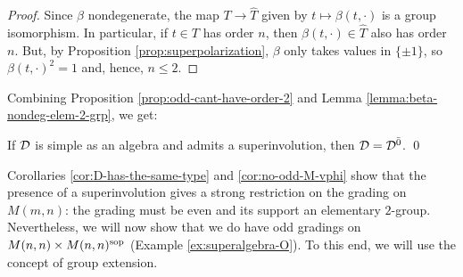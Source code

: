 \begin{proof}
    Since $\beta$ nondegenerate, the map $T \to \widehat T$ given by $t \mapsto \beta(t, \cdot)$ is a group isomorphism.
    In particular, if $t\in T$ has order $n$, then $\beta(t, \cdot)\in \widehat T$ also has order $n$.
    But, by Proposition \ref{prop:superpolarization}, $\beta$ only takes values in $\{ \pm 1\}$, so  $\beta(t, \cdot )^2 =1$ and, hence, $ n \leq 2$.
\end{proof}

Combining Proposition \ref{prop:odd-cant-have-order-2} and Lemma \ref{lemma:beta-nondeg-elem-2-grp}, we get:

\begin{cor}\label{cor:no-odd-M-vphi}
    If $\mathcal{D}$ is simple as an algebra and admits a superinvolution, then $\mathcal{D} = \mathcal{D}^{\bar0}$. \qed
\end{cor}


Corollaries \ref{cor:D-has-the-same-type} and \ref{cor:no-odd-M-vphi} show that the presence of a superinvolution gives a strong restriction on the grading on $M(m,n)$: the grading must be even and its support an elementary $2$-group. 
Nevertheless, we will now show that we do have odd gradings on $M(n,n)\times M(n,n)^{\mathrm{sop}}$ (Example \ref{ex:superalgebra-O}). 
To this end, we will use the concept of group extension.

